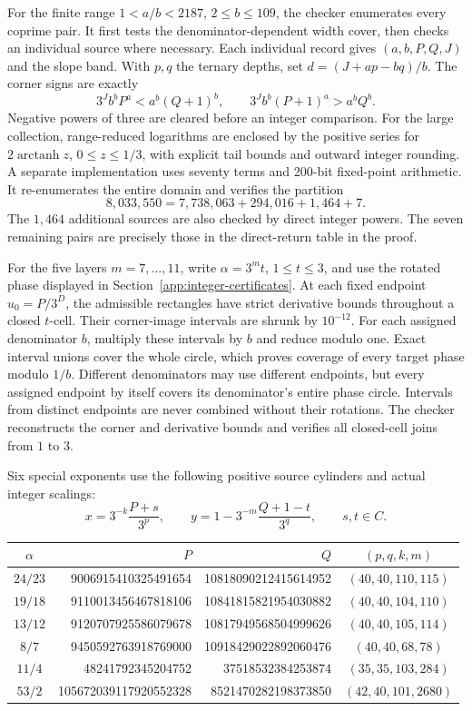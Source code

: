 \documentclass[11pt,a4paper]{article}
\begin{document}
For the finite range \(1<a/b<2187\), \(2\leq b\leq109\),
the checker enumerates every coprime pair. It first tests the
denominator-dependent width cover, then checks an individual source
where necessary. Each individual record gives \((a,b,P,Q,J)\) and
the slope band. With \(p,q\) the ternary depths, set
\(d=(J+ap-bq)/b\). The corner signs are exactly
\[
3^Jb^bP^a<a^b(Q+1)^b,\qquad
3^Jb^b(P+1)^a>a^bQ^b.
\]
Negative powers of three are cleared before an integer comparison.
For the large collection, range-reduced logarithms are enclosed by
the positive series for \(2\operatorname{arctanh}z\), \(0\leq z\leq1/3\),
with explicit tail bounds and outward integer rounding. A separate
implementation uses seventy terms and 200-bit fixed-point arithmetic.
It re-enumerates the entire domain and verifies the partition
\[
8{,}033{,}550=7{,}738{,}063+294{,}016+1{,}464+7.
\]
The \(1{,}464\) additional sources are also checked by direct integer
powers. The seven remaining pairs are precisely those in the
direct-return table in the proof.

For the five layers \(m=7,\ldots,11\), write \(\alpha=3^mt\),
\(1\leq t\leq3\), and use the rotated phase displayed in
Section~\ref{app:integer-certificates}. At each fixed endpoint
\(u_0=P/3^D\), the admissible rectangles have strict derivative
bounds throughout a closed \(t\)-cell. Their corner-image intervals
are shrunk by \(10^{-12}\). For each assigned denominator \(b\),
multiply these intervals by \(b\) and reduce modulo one. Exact
interval unions cover the whole circle, which proves coverage of
every target phase modulo \(1/b\). Different denominators may use
different endpoints, but every assigned endpoint by itself covers
its denominator's entire phase circle. Intervals from distinct
endpoints are never combined without their rotations. The checker
reconstructs the corner and derivative bounds and verifies all
closed-cell joins from \(1\) to \(3\).

Six special exponents use the following positive source cylinders
and actual integer scalings:
\[
x=3^{-k}\frac{P+s}{3^p},\qquad
y=1-3^{-m}\frac{Q+1-t}{3^q},\qquad s,t\in C.
\]
\begin{center}
\small
\begin{tabular}{c|r|r|c}
\(\alpha\)&\(P\)&\(Q\)&\((p,q,k,m)\)\\ \hline
\(24/23\)&9006915410325491654&10818090212415614952&\((40,40,110,115)\)\\
\(19/18\)&9110013456467818106&10841815821954030882&\((40,40,104,110)\)\\
\(13/12\)&9120707925586079678&10817949568504999626&\((40,40,105,114)\)\\
\(8/7\)&9450592763918769000&10918429022892060476&\((40,40,68,78)\)\\
\(11/4\)&48241792345204752&37518532384253874&\((35,35,103,284)\)\\
\(53/2\)&105672039117920552328&8521470282198373850&\((42,40,101,2680)\)\\
\end{tabular}
\end{center}
\end{document}
